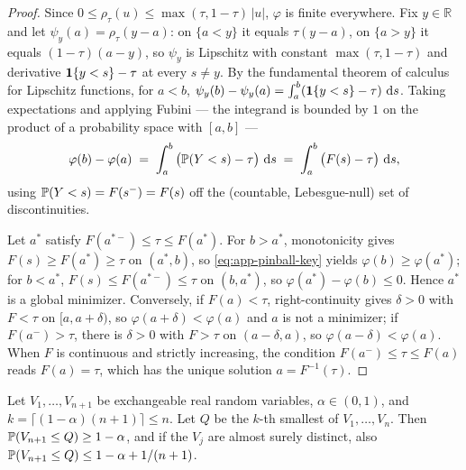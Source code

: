 \begin{proof}
Since $0 \le \rho_\tau(u) \le \max(\tau, 1-\tau)\,|u|$, $\varphi$ is finite everywhere. Fix $y \in
\mathbb{R}$ and let $\psi_y(a) = \rho_\tau(y - a)$: on $\{a < y\}$ it equals $\tau(y-a)$, on $\{a >
y\}$ it equals $(1-\tau)(a-y)$, so $\psi_y$ is Lipschitz with constant $\max(\tau, 1-\tau)$ and
derivative $\mathbf{1}\{y < s\} - \tau$ at every $s \ne y$. By the fundamental theorem of calculus for
Lipschitz functions, for $a < b$, $\psi_y(b) - \psi_y(a) = \int_a^b (\mathbf{1}\{y < s\} - \tau)\, \,\mathrm{d} s$.
Taking expectations and applying Fubini --- the integrand is bounded by $1$ on the product of a
probability space with $[a,b]$ ---
\begin{equation}
\label{eq:app-pinball-key}
\varphi(b) - \varphi(a) \;=\; \int_a^b \big( \mathbb{P}(Y < s) - \tau \big)\, \,\mathrm{d} s
\;=\; \int_a^b \big( F(s) - \tau \big)\, \,\mathrm{d} s ,
\end{equation}
using $\mathbb{P}(Y < s) = F(s^-) = F(s)$ off the (countable, Lebesgue-null) set of discontinuities.

Let $a^*$ satisfy $F(a^{*-}) \le \tau \le F(a^*)$. For $b > a^*$, monotonicity gives $F(s) \ge
F(a^*) \ge \tau$ on $(a^*, b)$, so \eqref{eq:app-pinball-key} yields $\varphi(b) \ge \varphi(a^*)$;
for $b < a^*$, $F(s) \le F(a^{*-}) \le \tau$ on $(b, a^*)$, so $\varphi(a^*) - \varphi(b) \le 0$.
Hence $a^*$ is a global minimizer. Conversely, if $F(a) < \tau$, right-continuity gives $\delta > 0$
with $F < \tau$ on $[a, a+\delta)$, so $\varphi(a + \delta) < \varphi(a)$ and $a$ is not a
minimizer; if $F(a^-) > \tau$, there is $\delta > 0$ with $F > \tau$ on $(a - \delta, a)$, so
$\varphi(a - \delta) < \varphi(a)$. When $F$ is continuous and strictly increasing, the condition
$F(a^-) \le \tau \le F(a)$ reads $F(a) = \tau$, which has the unique solution $a = F^{-1}(\tau)$.
\end{proof}

\begin{lemma}
\label{lem:app-rank}
Let $V_1, \dots, V_{n+1}$ be exchangeable real random variables, $\alpha \in (0,1)$, and $k = \lceil
(1-\alpha)(n+1) \rceil \le n$. Let $Q$ be the $k$-th smallest of $V_1, \dots, V_n$. Then
$\mathbb{P}(V_{n+1} \le Q) \ge 1 - \alpha$, and if the $V_j$ are almost surely distinct, also
$\mathbb{P}(V_{n+1} \le Q) \le 1 - \alpha + 1/(n+1)$.
\end{lemma}

